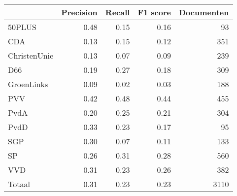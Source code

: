 \begin{tabular}{lrrrr}
\toprule
{} &  Precision &  Recall &  F1 score &  Documenten \\
\midrule
50PLUS       &       0.48 &    0.15 &      0.16 &          93 \\
CDA          &       0.13 &    0.15 &      0.12 &         351 \\
ChristenUnie &       0.13 &    0.07 &      0.09 &         239 \\
D66          &       0.19 &    0.27 &      0.18 &         309 \\
GroenLinks   &       0.09 &    0.02 &      0.03 &         188 \\
PVV          &       0.42 &    0.48 &      0.44 &         455 \\
PvdA         &       0.20 &    0.25 &      0.21 &         304 \\
PvdD         &       0.33 &    0.23 &      0.17 &          95 \\
SGP          &       0.30 &    0.07 &      0.11 &         133 \\
SP           &       0.26 &    0.31 &      0.28 &         560 \\
VVD          &       0.31 &    0.23 &      0.26 &         382 \\
Totaal       &       0.31 &    0.23 &      0.23 &        3110 \\
\bottomrule
\end{tabular}
